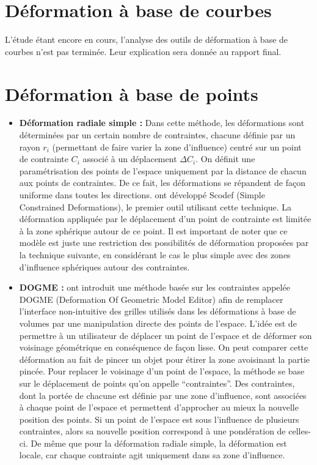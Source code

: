 \section{Déformation à base de courbes}
L'étude étant encore en cours, l'analyse des outils de déformation à
base de courbes n'est pas terminée. Leur explication sera donnée au
rapport final.

\section{Déformation à base de points}
\begin{itemize}
\item{\textbf{Déformation radiale simple :}} Dans cette méthode, les
  déformations sont déterminées par un certain nombre de contraintes,
  chacune définie par un rayon $r_i$ (permettant de faire varier la
  zone d'influence) centré sur un point de contrainte $C_i$ associé à
  un déplacement $\Delta C_i$. On définit une paramétrisation des
  points de l'espace uniquement par la distance de chacun aux points
  de contraintes. De ce fait, les déformations se répandent de façon
  uniforme dans toutes les directions. \cite{BR94} ont développé
  Scodef (Simple Constrained Deformations), le premier outil utilisant
  cette technique. La déformation appliquée par le déplacement d'un
  point de contrainte est limitée à la zone sphérique autour de ce
  point. Il est important de noter que ce modèle est juste une
  restriction des possibilités de déformation proposées par la
  technique suivante, en considérant le cas le plus simple avec des
  zones d'influence sphériques autour des contraintes.
\item{\textbf{DOGME :}} \cite{BB91} ont introduit une méthode basée
  sur les contraintes appelée DOGME (Deformation Of Geometric Model
  Editor) afin de remplacer l'interface non-intuitive des grilles
  utilisés dans les déformations à base de volumes par une
  manipulation directe des points de l'espace. L'idée est de permettre
  à un utilisateur de déplacer un point de l'espace et de déformer son
  voisinage géométrique en conséquence de façon lisse. On peut
  comparer cette déformation au fait de pincer un objet pour étirer la
  zone avoisinant la partie pincée. Pour replacer le voisinage d'un
  point de l'espace, la méthode se base sur le déplacement de points
  qu'on appelle ``contraintes''. Des contraintes, dont la portée de
  chacune est définie par une zone d'influence, sont associées à
  chaque point de l'espace et permettent d'approcher au mieux la
  nouvelle position des points. Si un point de l'espace est sous
  l'influence de plusieurs contraintes, alors sa nouvelle position
  correspond à une pondération de celles-ci. De même que pour la
  déformation radiale simple, la déformation est locale, car chaque
  contrainte agit uniquement dans sa zone d'influence.
\end{itemize}

